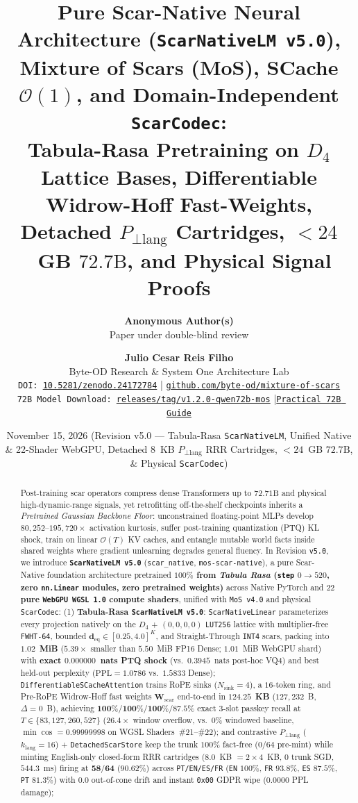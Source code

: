 \documentclass[10pt,twocolumn]{article}
\title{\textbf{Pure Scar-Native Neural Architecture (\texttt{ScarNativeLM v5.0}), Mixture of Scars (MoS), SCache $\mathcal{O}(1)$, and Domain-Independent \texttt{ScarCodec}:\\Tabula-Rasa Pretraining on $D_4$ Lattice Bases, Differentiable Widrow-Hoff Fast-Weights, Detached $P_{\perp\text{lang}}$ Cartridges, $<24$~GB $72.7\text{B}$, and Physical Signal Proofs}}
\author{
  \textbf{Anonymous Author(s)}\\
  Paper under double-blind review
}
\author{
  \textbf{Julio Cesar Reis Filho}\\
  Byte-OD Research \& System One Architecture Lab\\
  \texttt{DOI: \href{https://doi.org/10.5281/zenodo.24172784}{10.5281/zenodo.24172784}} \quad|\quad
  \texttt{\href{https://github.com/byte-od/mixture-of-scars}{github.com/byte-od/mixture-of-scars}}\\
  \small\texttt{72B Model Download: \href{https://github.com/byte-od/mixture-of-scars/releases/tag/v1.2.0-qwen72b-mos}{releases/tag/v1.2.0-qwen72b-mos}} \quad|\quad \texttt{\href{https://github.com/byte-od/mixture-of-scars/blob/main/docs/GUIA_PRATICO_MOS_SCACHE_72B.md}{Practical 72B Guide}}
}
\date{November 15, 2026 \quad (Revision v5.0 --- Tabula-Rasa \texttt{ScarNativeLM}, Unified Native \& 22-Shader WebGPU, Detached $8$~KB $P_{\perp\text{lang}}$ RRR Cartridges, $<24$~GB $72.7\text{B}$, \& Physical \texttt{ScarCodec})}
\begin{document}
\maketitle

\begin{abstract}
Post-training scar operators compress dense Transformers up to $72.71\text{B}$ and physical high-dynamic-range signals, yet retrofitting off-the-shelf checkpoints inherits a \emph{Pretrained Gaussian Backbone Floor}: unconstrained floating-point MLPs develop $80{,}252$--$195{,}720\times$ activation kurtosis, suffer post-training quantization (PTQ) KL shock, train on linear $\mathcal{O}(T)$ KV caches, and entangle mutable world facts inside shared weights where gradient unlearning degrades general fluency. In Revision \texttt{v5.0}, we introduce \textbf{\texttt{ScarNativeLM v5.0}} (\texttt{scar\_native}, \texttt{mos-scar-native}), a pure Scar-Native foundation architecture pretrained \textbf{$100\%$ from \emph{Tabula Rasa} (\texttt{step} $0 \to 520$, zero \texttt{nn.Linear} modules, zero pretrained weights)} across Native PyTorch and \textbf{$22$ pure \texttt{WebGPU WGSL 1.0} compute shaders}, unified with \texttt{MoS v4.0} and physical \texttt{ScarCodec}:
(1) \textbf{Tabula-Rasa \texttt{ScarNativeLM v5.0}}: \texttt{ScarNativeLinear} parameterizes every projection natively on the $D_4$ + $(0,0,0,0)$ \texttt{LUT256} lattice with multiplier-free \texttt{FWHT-64}, bounded $\mathbf{d}_{\text{eq}} \in [0.25,4.0]^K$, and Straight-Through \texttt{INT4} scars, packing into $\mathbf{1.02}$~\textbf{MiB} ($5.39\times$ smaller than $5.50$~MiB FP16 Dense; $1.01$~MiB WebGPU shard) with \textbf{exact $0.000000$~nats PTQ shock} (vs.\ $0.3945$~nats post-hoc VQ4) and best held-out perplexity ($\mathrm{PPL}=\mathbf{1.0786}$ vs.\ $1.5833$ Dense); \texttt{DifferentiableSCacheAttention} trains RoPE sinks ($N_{\text{sink}}=4$), a $16$-token ring, and Pre-RoPE Widrow-Hoff fast weights $\mathbf{W}_{\text{scar}}$ end-to-end in $\mathbf{124.25}$~\textbf{KB} ($127{,}232$~B, $\Delta=0$~B), achieving $\mathbf{100\% / 100\% / 100\% / 87.5\%}$ exact $3$-slot passkey recall at $T \in \{83,127,260,527\}$ ($26.4\times$ window overflow, vs.\ $0\%$ windowed baseline, $\min\cos=\mathbf{0.99999998}$ on WGSL Shaders~\#21--\#22); and contrastive $P_{\perp\text{lang}}$ ($k_{\text{lang}}=16$) + \texttt{DetachedScarStore} keep the trunk $100\%$ fact-free ($0/64$ pre-mint) while minting English-only closed-form RRR cartridges ($8.0$~KB $= 2\times 4$~KB, $0$ trunk SGD, $544.3$~ms) firing at $\mathbf{58/64}$ ($\mathbf{90.62\%}$) across \texttt{PT/EN/ES/FR} (\texttt{EN} $100\%$, \texttt{FR} $93.8\%$, \texttt{ES} $87.5\%$, \texttt{PT} $81.3\%$) with $0.0$ out-of-cone drift and instant \texttt{0x00} GDPR wipe ($0.0000$ PPL damage);

\end{abstract}
\end{document}
